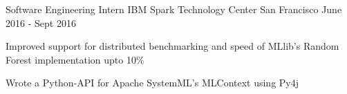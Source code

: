 \begin{cventries}
  \cventry
    {Software Engineering Intern}
    {IBM Spark Technology Center}
    {San Francisco}
    {June 2016 - Sept 2016}
    {
      \begin{cvitems}
        \item {Improved support for distributed benchmarking and speed of MLlib's Random Forest implementation upto 10\%}
        \item {Wrote a Python-API for Apache SystemML's MLContext using Py4j}
      \end{cvitems}
    }
\end{cventries}
